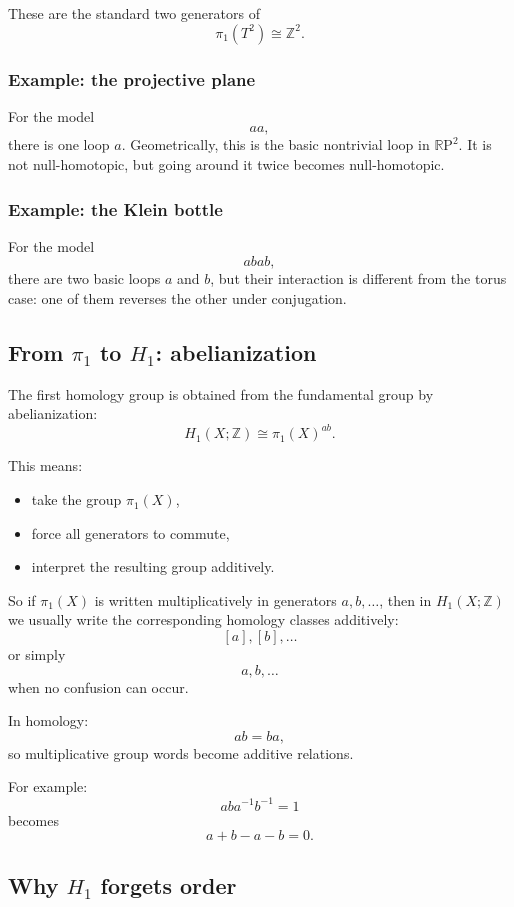 \documentclass[12pt,a4paper]{article}
\newcommand{\RP}{\mathbb{R}\mathrm{P}}
\newcommand{\Z}{\mathbb{Z}}
\theoremstyle{notespace}
\begin{document}
These are the standard two generators of
\[
\pi_1(T^2)\cong \Z^2.
\]

\subsubsection*{Example: the projective plane}

For the model
\[
aa,
\]
there is one loop \(a\). Geometrically, this is the basic nontrivial loop in \(\RP^2\). It is not null-homotopic, but going around it twice becomes null-homotopic.

\subsubsection*{Example: the Klein bottle}

For the model
\[
abab,
\]
there are two basic loops \(a\) and \(b\), but their interaction is different from the torus case: one of them reverses the other under conjugation.

\subsection{From \(\pi_1\) to \(H_1\): abelianization}

The first homology group is obtained from the fundamental group by abelianization:
\[
H_1(X;\Z)\cong \pi_1(X)^{ab}.
\]

This means:
\begin{itemize}
	\item take the group \(\pi_1(X)\),
	\item force all generators to commute,
	\item interpret the resulting group additively.
\end{itemize}

So if \(\pi_1(X)\) is written multiplicatively in generators \(a,b,\dots\), then in \(H_1(X;\Z)\) we usually write the corresponding homology classes additively:
\[
[a],[b],\dots
\]
or simply
\[
a,b,\dots
\]
when no confusion can occur.

In homology:
\[
ab=ba,
\]
so multiplicative group words become additive relations.

For example:
\[
aba^{-1}b^{-1}=1
\]
becomes
\[
a+b-a-b=0.
\]

\subsection{Why \(H_1\) forgets order}
\end{document}
